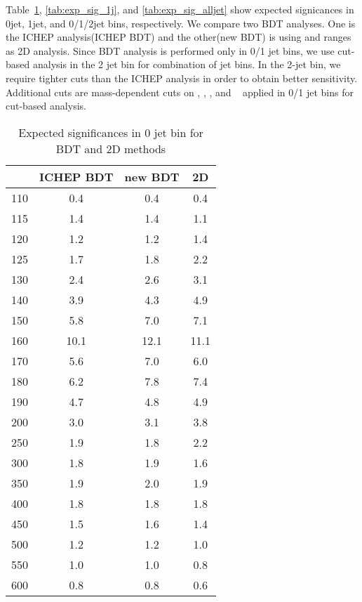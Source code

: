 Table~\ref{tab:exp_sig_0j}, \ref{tab:exp_sig_1j}, and \ref{tab:exp_sig_alljet} 
show expected signicances in 0jet, 1jet, and 0/1/2jet bins, respectively.
We compare two BDT analyses. One is the ICHEP analysis(ICHEP BDT) and 
the other(new BDT) is using \mt and \mll ranges as 2D analysis. 
Since BDT analysis is performed only in 0/1 jet bins, 
we use cut-based analysis in the 2 jet bin for combination of jet bins. 
In the 2-jet bin, we require tighter cuts than the ICHEP analysis
in order to obtain better sensitivity. Additional cuts are 
mass-dependent cuts on \ptlmax, \ptlmin, \mll, and \delphill~ 
applied in 0/1 jet bins for cut-based analysis. 

\begin{table}[!htb] 
	\centering
	\begin{tabular}{c | c c c  }
   	\hline \hline
	\mHi & ICHEP BDT & new BDT & 2D \\
	\hline
	110	&0.4	&0.4	&0.4 	\\
	115	&1.4	&1.4	&1.1 	\\
	120	&1.2	&1.2	&1.4 	\\
	125	&1.7	&1.8	&2.2 	\\
	130	&2.4	&2.6	&3.1 	\\
	140	&3.9	&4.3	&4.9 	\\
	150	&5.8	&7.0	&7.1	\\
	160	&10.1	&12.1	&11.1 	\\
	170	&5.6	&7.0	&6.0 	\\	
	180	&6.2	&7.8	&7.4    \\ 
	190	&4.7	&4.8	&4.9    \\
	200	&3.0	&3.1	&3.8    \\
	250	&1.9	&1.8	&2.2    \\
	300	&1.8	&1.9	&1.6    \\
	350	&1.9	&2.0	&1.9    \\
	400	&1.8	&1.8	&1.8    \\
	450	&1.5	&1.6	&1.4    \\
	500	&1.2	&1.2	&1.0    \\
	550	&1.0	&1.0	&0.8    \\
	600	&0.8	&0.8	&0.6    \\
   	\hline \hline
	\end{tabular}
	\label{tab:exp_sig_0j}
	\caption{Expected significances in 0 jet bin for BDT and 2D methods}
\end{table}

